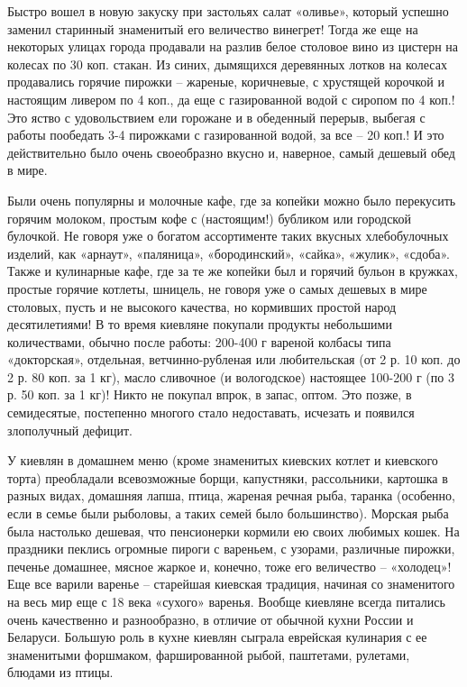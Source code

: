 Быстро вошел в новую закуску при застольях салат «оливье», который успешно
заменил старинный знаменитый его величество винегрет! Тогда же еще на некоторых
улицах города продавали на разлив белое столовое вино из цистерн на колесах по
30 коп. стакан. Из синих, дымящихся деревянных лотков на колесах продавались
горячие пирожки – жареные, коричневые, с хрустящей корочкой и настоящим ливером
по 4 коп., да еще с газированной водой с сиропом по 4 коп.! Это яство с
удовольствием ели горожане и в обеденный перерыв, выбегая с работы пообедать
3-4 пирожками с газированной водой, за все – 20 коп.! И это действительно было
очень своеобразно вкусно и, наверное, самый дешевый обед в мире. 

Были очень популярны и молочные кафе, где за копейки можно было перекусить
горячим молоком, простым кофе с (настоящим!) бубликом или городской булочкой.
Не говоря уже о богатом ассортименте таких вкусных хлебобулочных изделий, как
«арнаут», «паляница», «бородинский», «сайка», «жулик», «сдоба». Также и
кулинарные кафе, где за те же копейки был и горячий бульон в кружках, простые
горячие котлеты, шницель, не говоря уже о самых дешевых в мире столовых, пусть
и не высокого качества, но кормивших простой народ десятилетиями!  В то время
киевляне покупали продукты небольшими количествами, обычно после работы:
200-400 г вареной колбасы типа «докторская», отдельная, ветчинно-рубленая или
любительская (от 2 р. 10 коп. до 2 р. 80 коп. за 1 кг), масло сливочное (и
вологодское) настоящее 100-200 г (по 3 р. 50 коп. за 1 кг)! Никто не покупал
впрок, в запас, оптом. Это позже, в семидесятые, постепенно многого стало
недоставать, исчезать и появился злополучный дефицит. 

У киевлян в домашнем меню (кроме знаменитых киевских котлет и киевского торта)
преобладали всевозможные борщи, капустняки, рассольники, картошка в разных
видах, домашняя лапша, птица, жареная речная рыба, таранка (особенно, если в
семье были рыболовы, а таких семей было большинство). Морская рыба была
настолько дешевая, что пенсионерки кормили ею своих любимых кошек. На праздники
пеклись огромные пироги с вареньем, с узорами, различные пирожки, печенье
домашнее, мясное жаркое и, конечно, тоже его величество – «холодец»! Еще все
варили варенье – старейшая киевская традиция, начиная со знаменитого на весь
мир еще с 18 века «сухого» варенья. Вообще киевляне всегда питались очень
качественно и разнообразно, в отличие от обычной кухни России и Беларуси.
Большую роль в кухне киевлян сыграла еврейская кулинария с ее знаменитыми
форшмаком, фаршированной рыбой, паштетами, рулетами, блюдами из птицы. 

